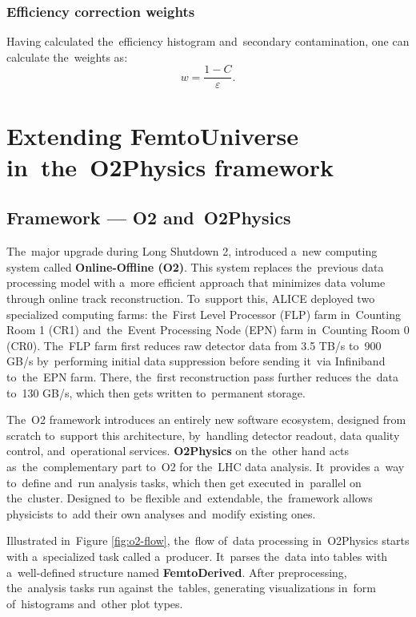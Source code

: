 \documentclass[11pt,a4paper,twoside]{book}
\numberwithin{equation}{chapter}
\begin{document}
\subsection{Efficiency correction weights}

Having calculated the efficiency histogram and secondary contamination, one can calculate the weights as:
\begin{equation}
    w = \frac{1 - C}{\varepsilon}.
\end{equation}


\chapter{Extending FemtoUniverse in the O2Physics framework}
\pagestyle{fancy}

\section{Framework — O2 and O2Physics}

The major upgrade during Long Shutdown 2, introduced a new computing system called \textbf{Online-Offline (O2)}. This system replaces the previous data processing model with a more efficient approach that minimizes data volume through online track reconstruction. To support this, ALICE deployed two specialized computing farms: the First Level Processor (FLP) farm in Counting Room 1 (CR1) and the Event Processing Node (EPN) farm in Counting Room 0 (CR0). The FLP farm first reduces raw detector data from 3.5 TB/s to 900 GB/s by performing initial data suppression before sending it via Infiniband to the EPN farm. There, the first reconstruction pass further reduces the data to 130 GB/s, which then gets written to permanent storage. \cite{alice-o2}

The O2 framework introduces an entirely new software ecosystem, designed from scratch to support this architecture, by handling detector readout, data quality control, and operational services. \textbf{O2Physics} on the other hand acts as the complementary part to O2 for the LHC data analysis. It provides a way to define and run analysis tasks, which then get executed in parallel on the cluster. Designed to be flexible and extendable, the framework allows physicists to add their own analyses and modify existing ones.

Illustrated in Figure \ref{fig:o2-flow}, the flow of data processing in O2Physics starts with a specialized task called a producer. It parses the data into tables with a well-defined structure named \textbf{FemtoDerived}. After preprocessing, the analysis tasks run against the tables, generating visualizations in form of histograms and other plot types.
\end{document}
